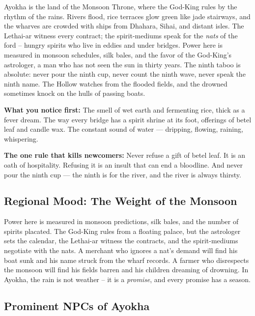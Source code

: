 \vspace{2mm}
\begin{tcolorbox}[colback=black!3,colframe=blue!60!black,title={Theme \& Atmosphere},breakable]
Ayokha is the land of the Monsoon Throne, where the God-King rules by the rhythm of the rains. Rivers flood, rice terraces glow green like jade stairways, and the wharves are crowded with ships from Dhahara, Sihai, and distant isles. The Lethai-ar witness every contract; the spirit-mediums speak for the \emph{nats} of the ford -- hungry spirits who live in eddies and under bridges. Power here is measured in monsoon schedules, silk bales, and the favor of the God-King's astrologer, a man who has not seen the sun in thirty years. The ninth taboo is absolute: never pour the ninth cup, never count the ninth wave, never speak the ninth name. The Hollow watches from the flooded fields, and the drowned sometimes knock on the hulls of passing boats.

\vspace{2mm}
\textbf{What you notice first:} The smell of wet earth and fermenting rice, thick as a fever dream. The way every bridge has a spirit shrine at its foot, offerings of betel leaf and candle wax. The constant sound of water --- dripping, flowing, raining, whispering.

\textbf{The one rule that kills newcomers:} Never refuse a gift of betel leaf. It is an oath of hospitality. Refusing it is an insult that can end a bloodline. And never pour the ninth cup --- the ninth is for the river, and the river is always thirsty.
\end{tcolorbox}

\subsection*{Regional Mood: The Weight of the Monsoon}

Power here is measured in monsoon predictions, silk bales, and the number of spirits placated. The God-King rules from a floating palace, but the astrologer sets the calendar, the Lethai-ar witness the contracts, and the spirit-mediums negotiate with the nats. A merchant who ignores a nat's demand will find his boat sunk and his name struck from the wharf records. A farmer who disrespects the monsoon will find his fields barren and his children dreaming of drowning. In Ayokha, the rain is not weather -- it is a \emph{promise}, and every promise has a season.

\subsection*{Prominent NPCs of Ayokha}
\label{sec:ayokha-npcs}

